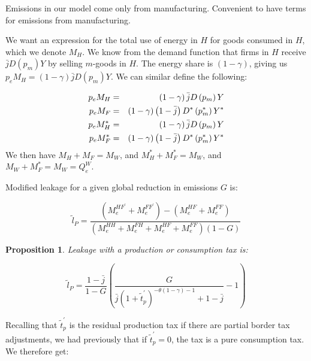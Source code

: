 \documentclass[notitlepage,12pt]{article}
\newtheorem{proposition}[theorem]{Proposition}
\begin{document}
Emissions in our model come only from manufacturing. Convenient to have
terms for emissions from manufacturing. 

We want an expression for the total use of energy in $H$ for goods consumed
in $H$, which we denote $M_{H}$. We know from the demand function that firms
in $H$ receive $\bar{j}D\left( p_{m}\right) Y$ by selling $m$-goods in $H$.
The energy share is $\left( 1-\gamma \right) $, giving us $p_{e}M_{H}=\left(
1-\gamma \right) \bar{j}D\left( p_{m}\right) Y$. We can similar define the
following:

\begin{eqnarray}
p_{e}M_{H} &=&\left( 1-\gamma \right) \bar{j}D\left( p_{m}\right) Y  \notag
\\
p_{e}M_{F} &=&\left( 1-\gamma \right) \left( 1-\bar{j}\right) D^{\ast
}\left( p_{m}^{\ast }\right) Y^{\ast }  \notag \\
p_{e}M_{H}^{\ast } &=&\left( 1-\gamma \right) \bar{j}D\left( p_{m}\right) Y 
\notag \\
p_{e}M_{F}^{\ast } &=&\left( 1-\gamma \right) \left( 1-\bar{j}\right)
D^{\ast }\left( p_{m}^{\ast }\right) Y^{\ast }
\end{eqnarray}%
We then have $M_{H}+M_{F}=M_{W}$, and $M_{H}^{\ast }+M_{F}^{\ast }=M_{W}$,
and $M_{W}+M_{F}^{\ast }=M_{W}=Q_{e}^{W}$.

Modified leakage for a given global reduction in emissions $G$ is:\ 

\begin{equation*}
\tilde{l}_{P}=\frac{\left( M_{e}^{HF^{\prime }}+M_{e}^{FF^{\prime }}\right)
-\left( M_{e}^{HF}+M_{e}^{FF}\right) }{\left(
M_{e}^{HH}+M_{e}^{FH}+M_{e}^{HF}+M_{e}^{FF}\right) \left( 1-G\right) }
\end{equation*}

\begin{proposition}
Leakage with a production or consumption tax is:
\end{proposition}

\begin{equation*}
\tilde{l}_{P}=\frac{1-\bar{j}}{1-G}\left( \frac{G}{\bar{j}\left( 1+\tilde{t}%
_{p}^{\prime }\right) ^{-\theta \left( 1-\gamma \right) -1}+1-\bar{j}}%
-1\right)
\end{equation*}

Recalling that $\tilde{t}_{p}^{\prime }$ is the residual production tax if
there are partial border tax adjustments, we had previously that if $\tilde{t%
}_{p}^{\prime }=0$, the tax is a pure consumption tax. We therefore get:
\end{document}

